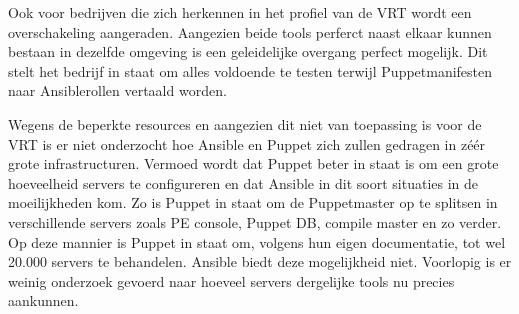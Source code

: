 Ook voor bedrijven die zich herkennen in het profiel van de VRT wordt een overschakeling aangeraden. Aangezien beide tools perferct naast elkaar kunnen bestaan in dezelfde omgeving is een geleidelijke overgang perfect mogelijk. Dit stelt het bedrijf in staat om alles voldoende te testen terwijl Puppetmanifesten naar Ansiblerollen vertaald worden.

Wegens de beperkte resources en aangezien dit niet van toepassing is voor de VRT is er niet onderzocht hoe Ansible en Puppet zich zullen gedragen in z\'e\'er grote infrastructuren. Vermoed wordt dat Puppet beter in staat is om een grote hoeveelheid servers te configureren en dat Ansible in dit soort situaties in de moeilijkheden kom. Zo is Puppet in staat om de Puppetmaster op te splitsen in verschillende servers zoals PE console, Puppet DB, compile master en zo verder. Op deze mannier is Puppet in staat om, volgens hun eigen documentatie, tot wel 20.000 servers te behandelen. Ansible biedt deze mogelijkheid niet. Voorlopig is er weinig onderzoek gevoerd naar hoeveel servers dergelijke tools nu precies aankunnen. 